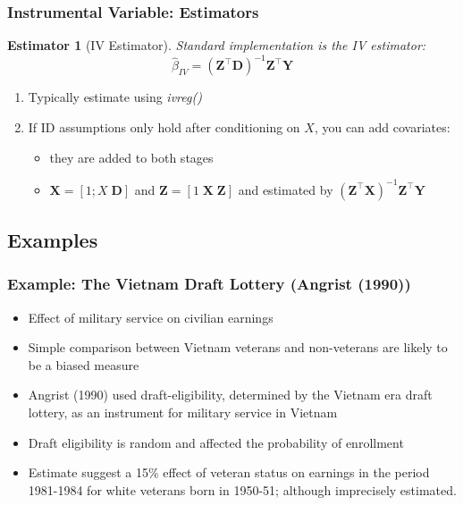 \documentclass[xcolor=dvipsnames]{beamer}
\newtheorem{esti}{Estimator}
\newcommand{\mb}{\mathbf}
\newcommand{\Z}{\ensuremath{\mb{Z}}}
\newcommand{\X}{\ensuremath{\mb{X}}}
\newcommand{\Y}{\ensuremath{\mb{Y}}}
\newcommand{\D}{\ensuremath{\mb{D}}}
\begin{document}
\begin{frame}
\frametitle{Instrumental Variable: Estimators}
\begin{esti}[IV Estimator]\footnotesize
Standard implementation is the IV estimator:
\[ \hat{\beta}_{IV} = (\Z^{\top} \D)^{-1} \Z^{\top} \Y   \]
\end{esti}
\begin{enumerate}
\item Typically estimate using \textit{ivreg()} 
\item If ID assumptions only hold after conditioning on $X$, you can add covariates:
\begin{itemize}
\item<3-> they are added to both stages
\smallskip
\item<4-> $\X=[1;X\; \D]$ and $\Z=[1\;\X\;\Z]$  and estimated  by $(\Z^{\top}\X)^{-1}\Z^{\top}\Y$
\end{itemize}
\end{enumerate}
\end{frame}



\subsection{Examples}



\begin{frame}
  \frametitle{Example: The Vietnam Draft Lottery (Angrist (1990))}
\begin{itemize}
 \item Effect of military service on civilian earnings
 \item Simple comparison between Vietnam veterans and non-veterans are likely to be a biased measure
 \item Angrist (1990) used draft-eligibility, determined by the Vietnam era
draft lottery, as an instrument for military service in Vietnam
\item Draft eligibility is random and affected the probability of enrollment
\item Estimate suggest a 15\% effect of veteran status on earnings in the period 1981-1984 for white veterans born in
1950-51; although imprecisely estimated.
\end{itemize}
\end{frame}
\end{document}
